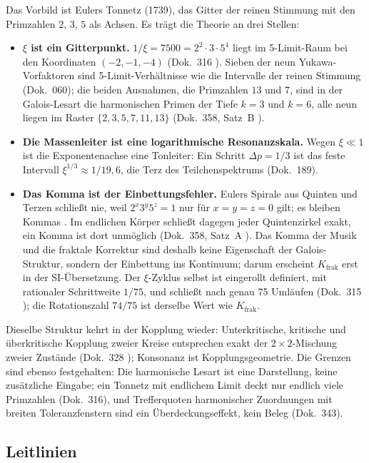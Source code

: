 Das Vorbild ist Eulers Tonnetz (1739), das Gitter der reinen Stimmung mit den Primzahlen
$2$, $3$, $5$ als Achsen. Es trägt die Theorie an drei Stellen:
\begin{itemize}[leftmargin=*,itemsep=2pt]
\item \textbf{$\xi$ ist ein Gitterpunkt.} $1/\xi=7500=2^2\cdot3\cdot5^4$ liegt im 5-Limit-Raum bei
  den Koordinaten $(-2,-1,-4)$ (Dok.~316 \KM). Sieben der neun Yukawa-Vorfaktoren sind
  5-Limit-Verhältnisse wie die Intervalle der reinen Stimmung (Dok.~060); die beiden Ausnahmen,
  die Primzahlen $13$ und $7$, sind in der Galois-Lesart die harmonischen Primen der Tiefe $k=3$
  und $k=6$, alle neun liegen im Raster $\{2,3,5,7,11,13\}$ (Dok.~358, Satz~B \BM).
\item \textbf{Die Massenleiter ist eine logarithmische Resonanzskala.} Wegen $\xi\ll1$ ist die
  Exponentenachse eine Tonleiter: Ein Schritt $\Delta p=1/3$ ist das feste Intervall
  $\xi^{1/3}\approx1/19{,}6$, die \glqq Terz\grqq{} des Teilchenspektrums (Dok.~189).
\item \textbf{Das Komma ist der Einbettungsfehler.} Eulers Spirale aus Quinten und Terzen schließt
  nie, weil $2^x3^y5^z=1$ nur für $x=y=z=0$ gilt; es bleiben Kommas \QM. Im endlichen Körper
  schließt dagegen jeder Quintenzirkel exakt, ein Komma ist dort unmöglich (Dok.~358, Satz~A
  \BM). Das Komma der Musik und die fraktale Korrektur sind deshalb keine Eigenschaft der
  Galois-Struktur, sondern der Einbettung ins Kontinuum; darum erscheint $K_{\text{frak}}$ erst in
  der SI-Übersetzung. Der $\xi$-Zyklus selbst ist eingerollt definiert, mit rationaler
  Schrittweite $1/75$, und schließt nach genau 75 Umläufen (Dok.~315 \BM); die Rotationszahl
  $74/75$ ist derselbe Wert wie $K_{\text{frak}}$.
\end{itemize}
Dieselbe Struktur kehrt in der Kopplung wieder: Unterkritische, kritische und überkritische
Kopplung zweier Kreise entsprechen exakt der $2\times2$-Mischung zweier Zustände (Dok.~328 \BM);
Konsonanz ist Kopplungsgeometrie. Die Grenzen sind ebenso festgehalten: Die harmonische Lesart ist
eine Darstellung, keine zusätzliche Eingabe; ein Tonnetz mit endlichem Limit deckt nur endlich
viele Primzahlen (Dok.~316), und Trefferquoten harmonischer Zuordnungen mit breiten
Toleranzfenstern sind ein Überdeckungseffekt, kein Beleg (Dok.~343).

\subsection{Leitlinien}

